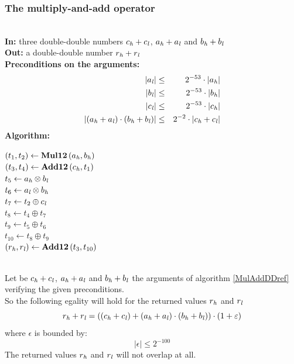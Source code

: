 \subsubsection{The multiply-and-add operator \MulAddDD}

\begin{algorithm}[\MulAddDD] \label{MulAddDDref} ~ \\
{\bf In:} three double-double numbers $c_{\mathit{h}} + c_{\mathit{l}}$, $a_{\mathit{h}} + a_{\mathit{l}}$ and 
$b_{\mathit{h}} + b_{\mathit{l}}$ \\
{\bf Out:} a double-double number $r_{\mathit{h}} + r_{\mathit{l}}$ \\
{\bf Preconditions on the arguments:}
\begin{eqnarray*}
\left \vert a_{\mathit{l}} \right \vert & \leq & 2^{-53} \cdot \left \vert a_{\mathit{h}} \right \vert \\
\left \vert b_{\mathit{l}} \right \vert & \leq & 2^{-53} \cdot \left \vert b_{\mathit{h}} \right \vert \\
\left \vert c_{\mathit{l}} \right \vert & \leq & 2^{-53} \cdot \left \vert c_{\mathit{h}} \right \vert \\
\left \vert \left( a_{\mathit{h}} + a_{\mathit{l}} \right) \cdot \left( b_{\mathit{h}} + b_{\mathit{l}} \right) \right \vert & 
\leq & 2^{-2} \cdot \left \vert c_{\mathit{h}} + c_{\mathit{l}} \right \vert 
\end{eqnarray*}
{\bf Algorithm:} \\
\begin{center}
\begin{minipage}[b]{50mm}
$\left(t_1, t_2 \right) \gets \mathbf{Mul12}\left( a_{\mathit{h}} , b_{\mathit{h}} \right)$ \\
$\left(t_3, t_4 \right) \gets \mathbf{Add12}\left( c_{\mathit{h}} , t_1 \right)$ \\
$t_5 \gets a_{\mathit{h}} \otimes b_{\mathit{l}}$ \\
$t_6 \gets a_{\mathit{l}} \otimes b_{\mathit{h}}$ \\
$t_7 \gets t_2 \oplus c_{\mathit{l}}$ \\
$t_8 \gets t_4 \oplus t_7$ \\
$t_9 \gets t_5 \oplus t_6$ \\
$t_{10} \gets t_8 \oplus t_9$ \\
$\left(r_{\mathit{h}}, r_{\mathit{l}} \right) \gets \mathbf{Add12}\left( t_3 , t_{10} \right)$ \\
\end{minipage}
\end{center}
\end{algorithm}
\begin{theorem} ~ \\
Let be $c_{\mathit{h}} + c_{\mathit{l}}$, $a_{\mathit{h}} + a_{\mathit{l}}$ and $b_{\mathit{h}} + b_{\mathit{l}}$ the 
arguments of algorithm \ref{MulAddDDref} \MulAddDD~ verifying the given 
preconditions.\\
So the following egality will hold for the returned values $r_{\mathit{h}}$ and $r_{\mathit{l}}$ 
$$r_{\mathit{h}} + r_{\mathit{l}} = \left( \left( c_{\mathit{h}} + c_{\mathit{l}} \right) + 
\left( a_{\mathit{h}} + a_{\mathit{l}} \right) \cdot \left( b_{\mathit{h}} + b_{\mathit{l}} \right) \right) \cdot 
\left( 1 + \varepsilon \right)$$
where $\epsilon$ is bounded by:
$$\left \vert \epsilon \right \vert \leq 2^{-100}$$
The returned values $r_{\mathit{h}}$ and $r_{\mathit{l}}$ will not overlap at all.
\end{theorem}

